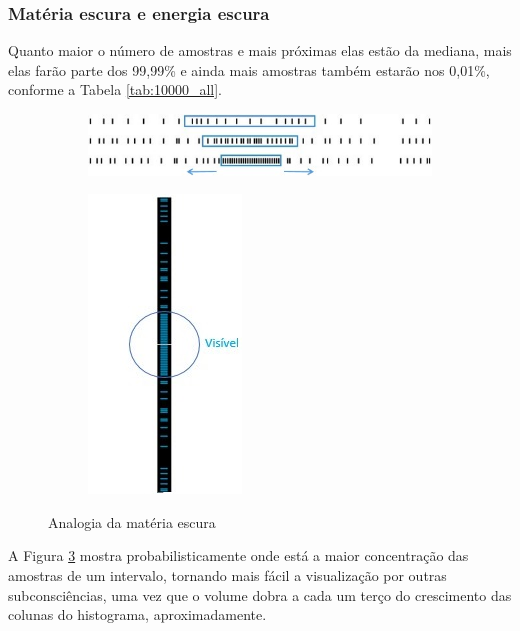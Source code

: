 \subsubsection{Matéria escura e energia escura}
Quanto maior o número de amostras e mais próximas elas estão da mediana, mais elas farão parte dos 99,99\% e ainda mais amostras também estarão nos 0,01\%, conforme a Tabela \ref{tab:10000_all}.
	\begin{figure}[H]
	\centering
		\begin{subfigure}[H]{1\linewidth}
		\centering
		\includegraphics[width=.76\linewidth]{sections/images/consciousness_dark_matter_dark_energy.jpg}
		\caption{}
		\label{fig:consciousness_dark_matter_dark_energy}
		\end{subfigure}
	\hfill
		\begin{subfigure}[H]{0.7\linewidth}
		\centering
		\includegraphics[width=.3\linewidth]{sections/images/consciousness_dark_matter_dark_energy_wave.jpg}
		\caption{}
		\label{fig:consciousness_dark_matter_dark_energy_wave}
		\end{subfigure}%
	\caption{Analogia da matéria escura}
	\end{figure}

A Figura \ref{fig:consciousness_dark_matter_dark_energy_wave} mostra probabilisticamente onde está a maior concentração das amostras de um intervalo, tornando mais fácil a visualização por outras subconsciências, uma vez que o volume dobra a cada um terço do crescimento das colunas do histograma, aproximadamente.

